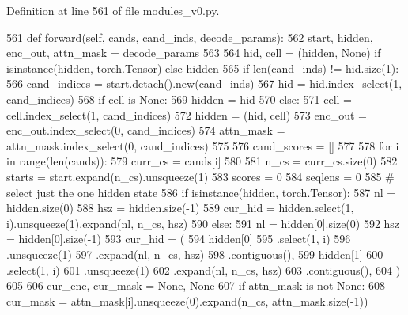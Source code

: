 Definition at line 561 of file modules\+\_\+v0.\+py.


\begin{DoxyCode}
561     \textcolor{keyword}{def }forward(self, cands, cand\_inds, decode\_params):
562         start, hidden, enc\_out, attn\_mask = decode\_params
563 
564         hid, cell = (hidden, \textcolor{keywordtype}{None}) \textcolor{keywordflow}{if} isinstance(hidden, torch.Tensor) \textcolor{keywordflow}{else} hidden
565         \textcolor{keywordflow}{if} len(cand\_inds) != hid.size(1):
566             cand\_indices = start.detach().new(cand\_inds)
567             hid = hid.index\_select(1, cand\_indices)
568             \textcolor{keywordflow}{if} cell \textcolor{keywordflow}{is} \textcolor{keywordtype}{None}:
569                 hidden = hid
570             \textcolor{keywordflow}{else}:
571                 cell = cell.index\_select(1, cand\_indices)
572                 hidden = (hid, cell)
573             enc\_out = enc\_out.index\_select(0, cand\_indices)
574             attn\_mask = attn\_mask.index\_select(0, cand\_indices)
575 
576         cand\_scores = []
577 
578         \textcolor{keywordflow}{for} i \textcolor{keywordflow}{in} range(len(cands)):
579             curr\_cs = cands[i]
580 
581             n\_cs = curr\_cs.size(0)
582             starts = start.expand(n\_cs).unsqueeze(1)
583             scores = 0
584             seqlens = 0
585             \textcolor{comment}{# select just the one hidden state}
586             \textcolor{keywordflow}{if} isinstance(hidden, torch.Tensor):
587                 nl = hidden.size(0)
588                 hsz = hidden.size(-1)
589                 cur\_hid = hidden.select(1, i).unsqueeze(1).expand(nl, n\_cs, hsz)
590             \textcolor{keywordflow}{else}:
591                 nl = hidden[0].size(0)
592                 hsz = hidden[0].size(-1)
593                 cur\_hid = (
594                     hidden[0]
595                     .select(1, i)
596                     .unsqueeze(1)
597                     .expand(nl, n\_cs, hsz)
598                     .contiguous(),
599                     hidden[1]
600                     .select(1, i)
601                     .unsqueeze(1)
602                     .expand(nl, n\_cs, hsz)
603                     .contiguous(),
604                 )
605 
606             cur\_enc, cur\_mask = \textcolor{keywordtype}{None}, \textcolor{keywordtype}{None}
607             \textcolor{keywordflow}{if} attn\_mask \textcolor{keywordflow}{is} \textcolor{keywordflow}{not} \textcolor{keywordtype}{None}:
608                 cur\_mask = attn\_mask[i].unsqueeze(0).expand(n\_cs, attn\_mask.size(-1))

\end{DoxyCode}
